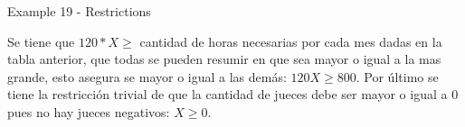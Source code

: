 \begin{frame}{Example 19 - Restrictions}

Se tiene que $120*X \ge$ cantidad de horas necesarias por cada mes dadas en la
tabla anterior, que todas se pueden resumir en que sea mayor o igual a la mas
grande, esto asegura se mayor o igual a las demás: $120X \ge 800$. Por último se
tiene la restricción trivial de que la cantidad de jueces debe ser mayor o igual
a 0 pues no hay jueces negativos: $X \ge 0$.

\end{frame}
